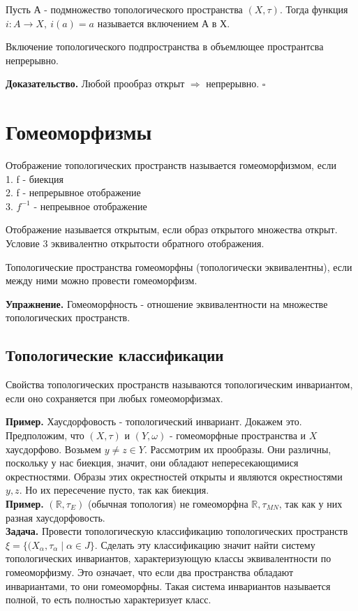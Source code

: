 \begin{defin}
Пусть А - подмножество топологического пространства $(X,\tau)$. Тогда функция 
$i\colon A\to X,~i(a)=a$ называется включением А в Х.
\end{defin}
\begin{theor}
Включение топологического подпространства в объемлющее пространтсва
непрерывно.
\end{theor}
\textbf{Доказательство.}  Любой прообраз открыт $\Rightarrow$ непрерывно.
$\square$ 
\section{Гомеоморфизмы}
\begin{defin}
Отображение топологических пространств называется гомеоморфизмом, если\\
1. f - биекция\\
2. f - непрерывное отображение\\
3. $f^{-1}$ - непреывное отображение
\end{defin}
Отображение называется открытым, если образ открытого множества открыт. 
Условие 3 эквивалентно открытости обратного отображения. 
\begin{defin}
Топологические пространства гомеоморфны (топологически эквивалентны), если
между ними можно провести гомеоморфизм.
\end{defin}
\textbf{Упражнение.} Гомеоморфность - отношение эквивалентности на множестве
топологических пространств.
\subsection{Топологические классификации}
\begin{defin}
Свойства топологических пространств называются топологическим инвариантом,
если оно сохраняется при любых гомеоморфизмах.
\end{defin}
\textbf{Пример.} Хаусдорфовость - топологический инвариант. Докажем это.
Предположим, что $(X,\tau)$ и  $(Y,\omega)$ - гомеоморфные пространства и $X$ 
хаусдорфово.  Возьмем $y\ne z\in Y$. Рассмотрим их прообразы. Они различны,
поскольку у нас биекция, значит, они обладают непересекающимися 
окрестностями. Образы этих окрестностей открыты и являются окрестностями 
$y,z$. Но их пересечение пусто, так как биекция.\\
\textbf{Пример.} $(\mathbb{R},\tau_E)$ (обычная топология) не гомеоморфна
$\mathbb{R},\tau_{MN}$, так как у них разная хаусдорфовость.\\
\textbf{Задача.} Провести топологическую классификацию топологических 
пространств $\xi=\{(X_\alpha,\tau_\alpha \mid \alpha\in J\}$.  
Сделать эту классификацию значит найти систему топологических инвариантов,
характеризующую классы эквивалентности по гомеоморфизму. Это означает,
что если два пространства обладают инвариантами, то они гомеоморфны. Такая 
система инвариантов называется полной, то есть полностью характеризует класс.
